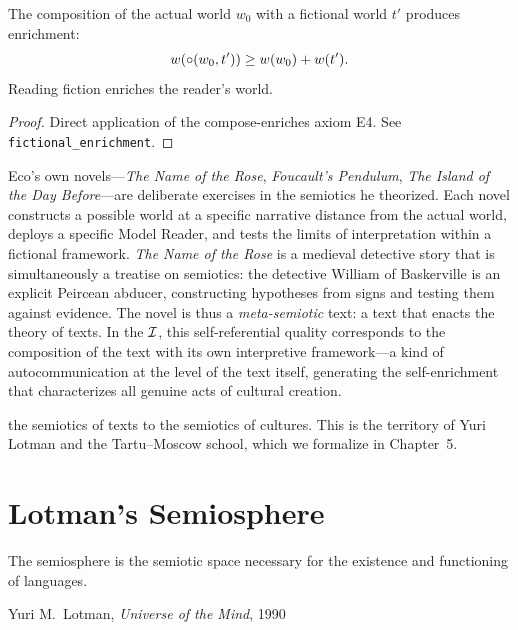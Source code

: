 \begin{theorem}
\label{thm:fictional-enrichment}
The composition of the actual world $w_0$ with a fictional world $t'$ produces enrichment:
\[
  w(\circ(w_0, t')) \geq w(w_0) + w(t').
\]
Reading fiction enriches the reader's world.
\end{theorem}

\begin{proof}
Direct application of the compose-enriches axiom E4. See \texttt{fictional\_enrichment}.
\end{proof}

\begin{remark}
Eco's own novels---\textit{The Name of the Rose}, \textit{Foucault's Pendulum}, \textit{The Island of the Day Before}---are deliberate exercises in the semiotics he theorized. Each novel constructs a possible world at a specific narrative distance from the actual world, deploys a specific Model Reader, and tests the limits of interpretation within a fictional framework. \textit{The Name of the Rose} is a medieval detective story that is simultaneously a treatise on semiotics: the detective William of Baskerville is an explicit Peircean abducer, constructing hypotheses from signs and testing them against evidence. The novel is thus a \emph{meta-semiotic} text: a text that enacts the theory of texts. In the $\mathcal{I}$, this self-referential quality corresponds to the composition of the text with its own interpretive framework---a kind of autocommunication at the level of the text itself, generating the self-enrichment that characterizes all genuine acts of cultural creation.
\end{remark}
the semiotics of texts to the semiotics of cultures. This is the
territory of Yuri Lotman and the Tartu--Moscow school, which we
formalize in Chapter~5.



\chapter{Lotman's Semiosphere}
\label{ch:lotman}

\epigraph{The semiosphere is the semiotic space necessary for the existence and functioning of languages.}{Yuri M.\ Lotman, \textit{Universe of the Mind}, 1990}

